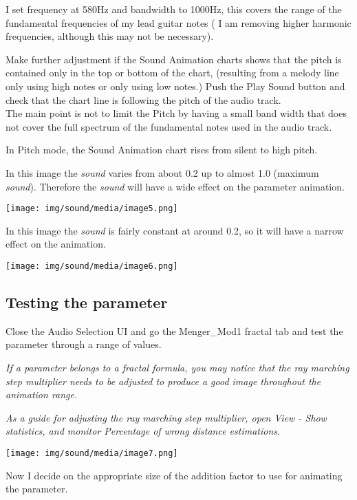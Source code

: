 I set frequency at 580Hz and bandwidth to 1000Hz, this covers the range
of the fundamental frequencies of my lead guitar notes ( I am removing
higher harmonic frequencies, although this may not be necessary).

Make further adjustment if the Sound Animation charts shows that the
pitch is contained only in the top or bottom of the chart, (resulting
from a melody line only using high notes or only using low notes.) Push
the Play Sound button and check that the chart line is following the
pitch of the audio track.\\
The main point is not to limit the Pitch by having a small band width
that does not cover the full spectrum of the fundamental notes used in
the audio track.

In Pitch mode, the Sound Animation chart rises from silent to high pitch.

In this image the \emph{sound} varies from about 0.2 up to almost 1.0
(maximum \emph{sound}). Therefore the \emph{sound} will have a wide
effect on the parameter animation.

\texttt{[image: img/sound/media/image5.png]}

In this image the \emph{sound} is fairly constant at around 0.2, so it
will have a narrow effect on the animation.

\texttt{[image: img/sound/media/image6.png]}

\subsection{Testing the parameter}\label{testing-the-parameter}

Close the Audio Selection UI and go the Menger\_Mod1 fractal tab and
test the parameter through a range of values.

\emph{If a parameter belongs to a fractal formula, you may notice that
the ray marching step multiplier needs to be adjusted to produce a good
image throughout the animation range.}

\emph{As a guide for adjusting the ray marching step multiplier, open
View - Show statistics, and monitor Percentage of wrong distance
estimations.}

\texttt{[image: img/sound/media/image7.png]}

Now I decide on the appropriate size of the addition factor to use for
animating the parameter.

